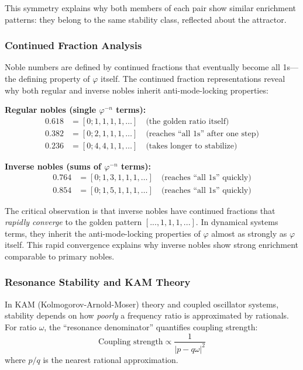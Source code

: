 \documentclass[11pt,a4paper]{article}
\newcommand{\phisym}{\varphi}
\begin{document}
This symmetry explains why both members of each pair show similar enrichment patterns: they belong to the same stability class, reflected about the attractor.

\subsubsection{Continued Fraction Analysis}
\label{sec:continued_fractions}

Noble numbers are defined by continued fractions that eventually become all 1s---the defining property of $\phisym$ itself. The continued fraction representations reveal why both regular and inverse nobles inherit anti-mode-locking properties:

\textbf{Regular nobles (single $\phisym^{-n}$ terms):}
\begin{align}
0.618 &= [0; 1, 1, 1, 1, \ldots] \quad \text{(the golden ratio itself)} \\
0.382 &= [0; 2, 1, 1, 1, \ldots] \quad \text{(reaches ``all 1s'' after one step)} \\
0.236 &= [0; 4, 4, 1, 1, \ldots] \quad \text{(takes longer to stabilize)}
\end{align}

\textbf{Inverse nobles (sums of $\phisym^{-n}$ terms):}
\begin{align}
0.764 &= [0; 1, 3, 1, 1, 1, \ldots] \quad \text{(reaches ``all 1s'' quickly)} \\
0.854 &= [0; 1, 5, 1, 1, 1, \ldots] \quad \text{(reaches ``all 1s'' quickly)}
\end{align}

The critical observation is that inverse nobles have continued fractions that \textit{rapidly converge} to the golden pattern $[..., 1, 1, 1, ...]$. In dynamical systems terms, they inherit the anti-mode-locking properties of $\phisym$ almost as strongly as $\phisym$ itself. This rapid convergence explains why inverse nobles show strong enrichment comparable to primary nobles.

\subsubsection{Resonance Stability and KAM Theory}
\label{sec:kam_theory}

In KAM (Kolmogorov-Arnold-Moser) theory and coupled oscillator systems, stability depends on how \textit{poorly} a frequency ratio is approximated by rationals. For ratio $\omega$, the ``resonance denominator'' quantifies coupling strength:
\begin{equation}
\text{Coupling strength} \propto \frac{1}{|p - q\omega|^2}
\end{equation}
where $p/q$ is the nearest rational approximation.
\end{document}
